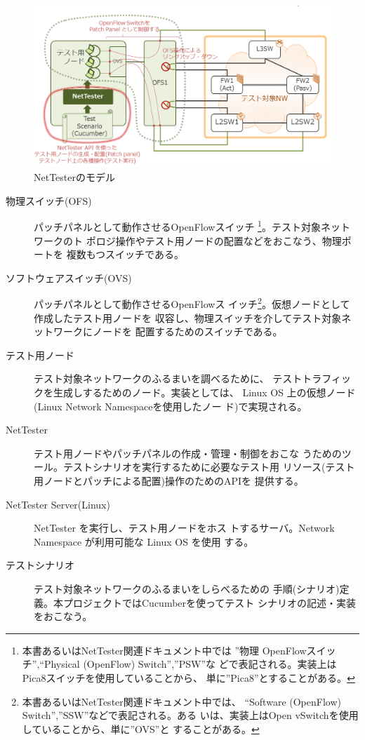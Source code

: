 \begin{figure}[h]
 \centering
 \includegraphics[scale=0.6]{img/model-nettester.png}
 \caption{NetTesterのモデル}
 \label{fig:model-nettester}
\end{figure}


\begin{description}
 \item[物理スイッチ(OFS)] パッチパネルとして動作させるOpenFlowスイッチ
            \footnote{本書あるいはNetTester関連ドキュメント中では ''物理
            OpenFlowスイッチ'',``Physical (OpenFlow) Switch'',''PSW''な
            どで表記される。実装上はPica8スイッチを使用していることから、
            単に''Pica8''とすることがある。}。テスト対象ネットワークのト
            ポロジ操作やテスト用ノードの配置などをおこなう、物理ポートを
            複数もつスイッチである。
 \item[ソフトウェアスイッチ(OVS)] パッチパネルとして動作させるOpenFlowス
            イッチ\footnote{本書あるいはNetTester関連ドキュメント中では、
            ``Software (OpenFlow) Switch'',''SSW''などで表記される。ある
            いは、実装上はOpen vSwitchを使用していることから、単に''OVS''と
            することがある。}。仮想ノードとして作成したテスト用ノードを
            収容し、物理スイッチを介してテスト対象ネットワークにノードを
            配置するためのスイッチである。
 \item[テスト用ノード] テスト対象ネットワークのふるまいを調べるために、
            テストトラフィックを生成しするためのノード。実装としては、
            Linux OS 上の仮想ノード(Linux Network Namespaceを使用したノー
            ド)で実現される。
 \item[NetTester] テスト用ノードやパッチパネルの作成・管理・制御をおこな
            うためのツール。テストシナリオを実行するために必要なテスト用
            リソース(テスト用ノードとパッチによる配置)操作のためのAPIを
            提供する。
 \item[NetTester Server(Linux)] NetTester を実行し、テスト用ノードをホス
            トするサーバ。Network Namespace が利用可能な Linux OS を使用
            する。
 \item[テストシナリオ] テスト対象ネットワークのふるまいをしらべるための
            手順(シナリオ)定義。本プロジェクトではCucumberを使ってテスト
            シナリオの記述・実装をおこなう。
\end{description}

